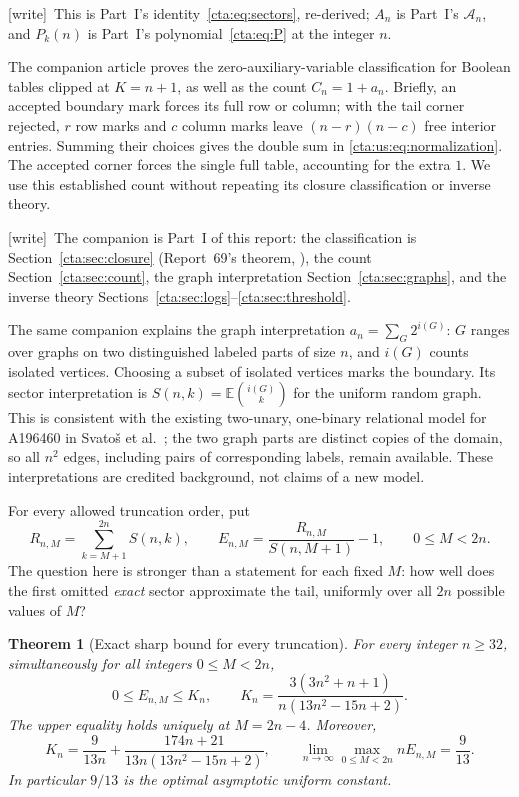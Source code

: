 \documentclass[11pt]{article}
\newtheorem{theorem}{Theorem}[section]
\theoremstyle{definition}
\theoremstyle{remark}
\newcommand{\E}{\mathbb E}
\newcommand{\As}{\mathcal A}
\newcommand{\wtag}{\textup{[write]}}
\begin{document}
\wtag\ This is Part~I's identity~\eqref{cta:eq:sectors}, re-derived; $A_n$
is Part~I's $\As_n$, and $P_k(n)$ is Part~I's polynomial~\eqref{cta:eq:P} at
the integer $n$.

The companion article \cite{fixed} proves the zero-auxiliary-variable
classification for Boolean tables clipped at $K=n+1$, as well as the count
$C_n=1+a_n$. Briefly, an accepted boundary mark forces its full row or
column; with the tail corner rejected, $r$ row marks and $c$ column marks
leave $(n-r)(n-c)$ free interior entries. Summing their choices gives the
double sum in \eqref{cta:us:eq:normalization}. The accepted corner forces the
single full table, accounting for the extra $1$. We use this established
count without repeating its closure classification or inverse theory.

\wtag\ The companion is Part~I of this report: the classification is
Section~\ref{cta:sec:closure} (Report~69's theorem, \cite{smc}), the count
Section~\ref{cta:sec:count}, the graph interpretation
Section~\ref{cta:sec:graphs}, and the inverse theory
Sections~\ref{cta:sec:logs}--\ref{cta:sec:threshold}.

The same companion explains the graph interpretation
$a_n=\sum_G2^{i(G)}$: $G$ ranges over graphs on two distinguished labeled
parts of size $n$, and $i(G)$ counts isolated vertices. Choosing a subset
of isolated vertices marks the boundary. Its sector interpretation is
$S(n,k)=\E\binom{i(G)}k$ for the uniform random graph. This is consistent
with the existing two-unary, one-binary relational model for A196460 in
Svato\v{s} et al.\ \cite{svatos}; the two graph parts are distinct copies
of the domain, so all $n^2$ edges, including pairs of corresponding labels,
remain available. These interpretations are credited background, not
claims of a new model.

For every allowed truncation order, put
\begin{equation}\label{cta:us:eq:excess}
 R_{n,M}=\sum_{k=M+1}^{2n}S(n,k),\qquad
 E_{n,M}=\frac{R_{n,M}}{S(n,M+1)}-1,
 \qquad 0\le M<2n.
\end{equation}
The question here is stronger than a statement for each fixed $M$:
how well does the first omitted \emph{exact} sector approximate the tail,
uniformly over all $2n$ possible values of $M$?

\begin{theorem}[Exact sharp bound for every truncation]\label{cta:us:thm:sharp}
For every integer $n\ge32$, simultaneously for all integers $0\le M<2n$,
\begin{equation}\label{cta:us:eq:sharp}
 0\le E_{n,M}\le K_n,
 \qquad K_n=\frac{3(3n^2+n+1)}{n(13n^2-15n+2)}.
\end{equation}
The upper equality holds uniquely at $M=2n-4$. Moreover,
\begin{equation}\label{cta:us:eq:Kcorrection}
 K_n=\frac{9}{13n}
     +\frac{174n+21}{13n(13n^2-15n+2)},\qquad
 \lim_{n\to\infty}\max_{0\le M<2n}nE_{n,M}=\frac9{13}.
\end{equation}
In particular $9/13$ is the optimal asymptotic uniform constant.
\end{theorem}
\end{document}
